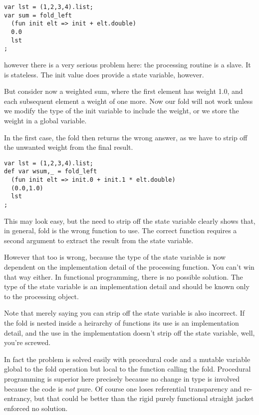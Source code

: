 \documentclass{article}
\begin{document}
\begin{verbatim}
var lst = (1,2,3,4).list;
var sum = fold_left 
  (fun init elt => init + elt.double)
  0.0
  lst
;
\end{verbatim}

however there is a very serious problem here: the
processing routine is a slave. It is stateless.
The init value does provide a state variable, however.

But consider now a weighted sum, where the first element
has weight 1.0, and each subsequent element a weight of
one more. Now our fold will not work unless we modify
the type of the init variable to include the weight,
or we store the weight in a global variable.

In the first case, the fold then returns the wrong answer,
as we have to strip off the unwanted weight from the final
result.

\begin{verbatim}
var lst = (1,2,3,4).list;
def var wsum,_ = fold_left 
  (fun init elt => init.0 + init.1 * elt.double)
  (0.0,1.0)
  lst
;
\end{verbatim}

This may look easy, but the need to strip off the state 
variable clearly shows that, in general, fold is the wrong
function to use. The correct function requires a second
argument to extract the result from the state variable.

However that too is wrong, because the type of the state
variable is now dependent on the implementation detail
of the processing function. You can't win that way either.
In functional programming, there is no possible solution.
The type of the state variable is an implementation detail
and should be known only to the processing object.

Note that merely saying you can strip off the state variable
is also incorrect. If the fold is nested inside a heirarchy
of functions its use is an implementation detail, and the 
use in the implementation doesn't strip off the state
variable, well, you're screwed.

In fact the problem is solved easily with procedural
code and a mutable variable global to the fold operation
but local to the function calling the fold. Procedural
programming is superior here precisely because no change
in type is involved because the code is {\em not} pure.
Of course one loses referential transparency and re-entrancy,
but that could be better than the rigid purely functional
straight jacket enforced no solution.
\end{document}
